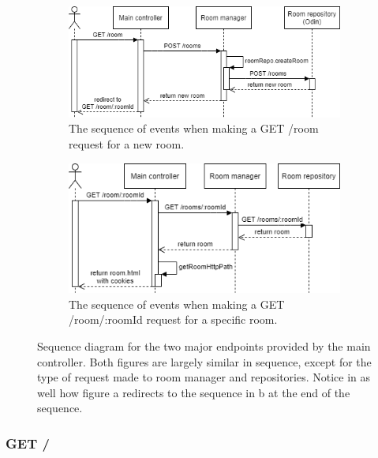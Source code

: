 \begin{figure}[H]
    \centering
    \begin{subfigure}[b]{0.48\textwidth}
        \centering
        \includegraphics[width=\textwidth]{Pictures/YggdrasilNewRoom.png}
        \caption{The sequence of events when making a GET /room request for a new room.}
        \label{fig:yggdrasilgetroom}
    \end{subfigure}
    \hfill
    \begin{subfigure}[b]{0.48\textwidth}
        \centering
        \includegraphics[width=\textwidth]{Pictures/YggdrasilGetRoom.png}
        \caption{The sequence of events when making a GET /room/:roomId request for a specific room.}
        \label{fig:yggdrasilgetspecificroom}
    \end{subfigure}
    \caption{Sequence diagram for the two major endpoints provided by the main controller. Both figures are largely similar in sequence, except for the type of request made to room manager and repositories. Notice in as well how figure a redirects to the sequence in b at the end of the sequence.}
    \label{fig:yggdrasilendpoints}
\end{figure}

\subsubsection{GET /}

